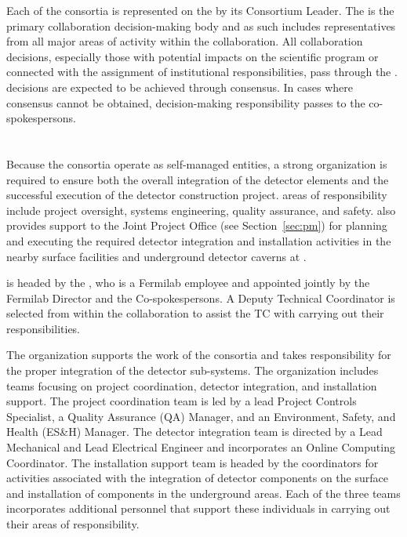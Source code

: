 Each of the consortia is represented on the   by
its Consortium Leader.  The   is the primary
collaboration decision-making body and as such includes
representatives from all major areas of activity within the
collaboration.  All collaboration decisions, especially those with
potential impacts on the  scientific program or connected with the
assignment of institutional responsibilities, pass through the
.   decisions are expected to be
achieved through consensus.  In cases where consensus cannot be
obtained, decision-making responsibility passes to the
co-spokespersons.

\section{}
\label{sec:tc}

Because the consortia operate as self-managed entities, a strong
 organization is required to ensure both the
overall integration of the detector elements and the successful
execution of the detector construction project.  
areas of responsibility include project oversight,
systems engineering, quality assurance, and safety.  
also provides support to the Joint Project Office (see
Section~\ref{sec:pm}) for planning and executing the required detector
integration and installation activities in the nearby surface
facilities and underground detector caverns at \surf.

  is headed by the , who is a
Fermilab employee and appointed jointly by the Fermilab Director and
the  Co-spokespersons.  A Deputy Technical Coordinator is
selected from within the collaboration to assist the TC with carrying
out their responsibilities.

The  organization supports the work of the
consortia and takes responsibility for the proper integration of the
detector sub-systems.  The organization includes teams focusing on
project coordination, detector integration, and installation support.
The project coordination team is led by a lead Project Controls
Specialist, a Quality Assurance (QA) Manager, and an Environment,
Safety, and Health (ES&H) Manager.  The detector integration team is
directed by a Lead Mechanical and Lead Electrical Engineer and
incorporates an Online Computing Coordinator.  The installation
support team is headed by the coordinators for activities associated
with the integration of detector components on the surface and
installation of components in the underground areas.  Each of the
three teams incorporates additional personnel that support these
individuals in carrying out their areas of responsibility.

